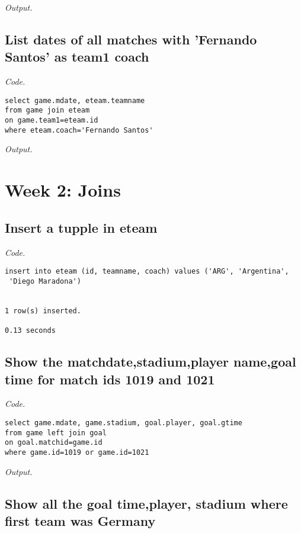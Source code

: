 \documentclass[12pt]{article}
\begin{document}
\textit{Output.}\\

\subsection{List dates of all matches with 'Fernando Santos' as team1 coach}

\textit{Code.}

\begin{lstlisting}
select game.mdate, eteam.teamname
from game join eteam
on game.team1=eteam.id
where eteam.coach='Fernando Santos'
\end{lstlisting}

\textit{Output.}\\

\section{Week 2: Joins}

\subsection{Insert a tupple in eteam}

\textit{Code.}

\begin{lstlisting}
insert into eteam (id, teamname, coach) values ('ARG', 'Argentina',
 'Diego Maradona')


1 row(s) inserted.

0.13 seconds
\end{lstlisting}

\subsection{Show the matchdate,stadium,player name,goal time for match ids 1019 and 1021}

\textit{Code.}

\begin{lstlisting}
select game.mdate, game.stadium, goal.player, goal.gtime
from game left join goal
on goal.matchid=game.id
where game.id=1019 or game.id=1021
\end{lstlisting}

\textit{Output.}\\

\subsection{Show all the goal time,player, stadium where first team was Germany}
\end{document}
